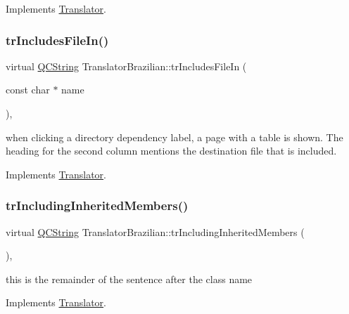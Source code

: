 Implements \mbox{\hyperlink{class_translator}{Translator}}.

\mbox{\label{class_translator_brazilian_addf78ebab5b4126e144ca5568fbd4e3a}} 
\subsubsection{\texorpdfstring{trIncludesFileIn()}{trIncludesFileIn()}}
{\footnotesize\ttfamily virtual \mbox{\hyperlink{class_q_c_string}{Q\+C\+String}} Translator\+Brazilian\+::tr\+Includes\+File\+In (\begin{DoxyParamCaption}\item[{const char $\ast$}]{name }\end{DoxyParamCaption})\hspace{0.3cm}{\ttfamily [inline]}, {\ttfamily [virtual]}}

when clicking a directory dependency label, a page with a table is shown. The heading for the second column mentions the destination file that is included. 

Implements \mbox{\hyperlink{class_translator}{Translator}}.

\mbox{\label{class_translator_brazilian_a6d59aca6c8eb0465c5d2abc5231267fa}} 
\subsubsection{\texorpdfstring{trIncludingInheritedMembers()}{trIncludingInheritedMembers()}}
{\footnotesize\ttfamily virtual \mbox{\hyperlink{class_q_c_string}{Q\+C\+String}} Translator\+Brazilian\+::tr\+Including\+Inherited\+Members (\begin{DoxyParamCaption}{ }\end{DoxyParamCaption})\hspace{0.3cm}{\ttfamily [inline]}, {\ttfamily [virtual]}}

this is the remainder of the sentence after the class name 

Implements \mbox{\hyperlink{class_translator}{Translator}}.

